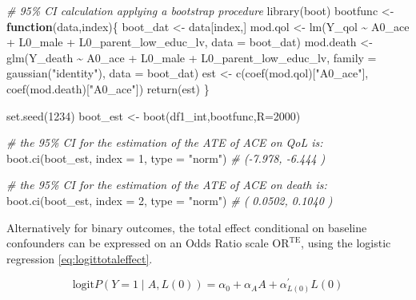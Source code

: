 \documentclass[
]{book}
\newenvironment{Shaded}{\begin{snugshade}}{\end{snugshade}}
\newcommand{\AttributeTok}[1]{\textcolor[rgb]{0.77,0.63,0.00}{#1}}
\newcommand{\CommentTok}[1]{\textcolor[rgb]{0.56,0.35,0.01}{\textit{#1}}}
\newcommand{\ControlFlowTok}[1]{\textcolor[rgb]{0.13,0.29,0.53}{\textbf{#1}}}
\newcommand{\DecValTok}[1]{\textcolor[rgb]{0.00,0.00,0.81}{#1}}
\newcommand{\FunctionTok}[1]{\textcolor[rgb]{0.00,0.00,0.00}{#1}}
\newcommand{\NormalTok}[1]{#1}
\newcommand{\OtherTok}[1]{\textcolor[rgb]{0.56,0.35,0.01}{#1}}
\newcommand{\SpecialCharTok}[1]{\textcolor[rgb]{0.00,0.00,0.00}{#1}}
\newcommand{\StringTok}[1]{\textcolor[rgb]{0.31,0.60,0.02}{#1}}
\begin{document}
\begin{Shaded}
\begin{Highlighting}[]
\CommentTok{\# 95\% CI calculation applying a bootstrap procedure}
\FunctionTok{library}\NormalTok{(boot)}
\NormalTok{bootfunc }\OtherTok{\textless{}{-}} \ControlFlowTok{function}\NormalTok{(data,index)\{}
\NormalTok{  boot\_dat }\OtherTok{\textless{}{-}}\NormalTok{ data[index,]}
\NormalTok{  mod.qol }\OtherTok{\textless{}{-}} \FunctionTok{lm}\NormalTok{(Y\_qol }\SpecialCharTok{\textasciitilde{}}\NormalTok{ A0\_ace }\SpecialCharTok{+}\NormalTok{ L0\_male }\SpecialCharTok{+}\NormalTok{ L0\_parent\_low\_educ\_lv,}
                \AttributeTok{data =}\NormalTok{ boot\_dat)}
\NormalTok{  mod.death }\OtherTok{\textless{}{-}} \FunctionTok{glm}\NormalTok{(Y\_death }\SpecialCharTok{\textasciitilde{}}\NormalTok{ A0\_ace }\SpecialCharTok{+}\NormalTok{ L0\_male }\SpecialCharTok{+}\NormalTok{ L0\_parent\_low\_educ\_lv,}
                   \AttributeTok{family =} \FunctionTok{gaussian}\NormalTok{(}\StringTok{"identity"}\NormalTok{),}
                   \AttributeTok{data =}\NormalTok{ boot\_dat)}
\NormalTok{  est }\OtherTok{\textless{}{-}} \FunctionTok{c}\NormalTok{(}\FunctionTok{coef}\NormalTok{(mod.qol)[}\StringTok{"A0\_ace"}\NormalTok{],}
           \FunctionTok{coef}\NormalTok{(mod.death)[}\StringTok{"A0\_ace"}\NormalTok{])}
  \FunctionTok{return}\NormalTok{(est)}
\NormalTok{\}}

\FunctionTok{set.seed}\NormalTok{(}\DecValTok{1234}\NormalTok{)}
\NormalTok{boot\_est }\OtherTok{\textless{}{-}} \FunctionTok{boot}\NormalTok{(df1\_int,bootfunc,}\AttributeTok{R=}\DecValTok{2000}\NormalTok{)}

\CommentTok{\# the 95\% CI for the estimation of the ATE of ACE on QoL is:}
\FunctionTok{boot.ci}\NormalTok{(boot\_est, }\AttributeTok{index =} \DecValTok{1}\NormalTok{, }\AttributeTok{type =} \StringTok{"norm"}\NormalTok{)}
\CommentTok{\# ({-}7.978, {-}6.444 )}

\CommentTok{\# the 95\% CI for the estimation of the ATE of ACE on death is:}
\FunctionTok{boot.ci}\NormalTok{(boot\_est, }\AttributeTok{index =} \DecValTok{2}\NormalTok{, }\AttributeTok{type =} \StringTok{"norm"}\NormalTok{)}
\CommentTok{\# ( 0.0502,  0.1040 )  }
\end{Highlighting}
\end{Shaded}

Alternatively for binary outcomes, the total effect conditional on baseline confounders can be expressed on an Odds Ratio scale \(\text{OR}^{\text{TE}}\), using the logistic regression \eqref{eq:logittotaleffect}.

\begin{equation} 
  \text{logit} P(Y = 1 \mid A, L(0)) = \alpha_0 + \alpha_A A + \alpha_{L(0)}^\prime L(0) 
  \label{eq:logittotaleffect}
\end{equation}
\end{document}
